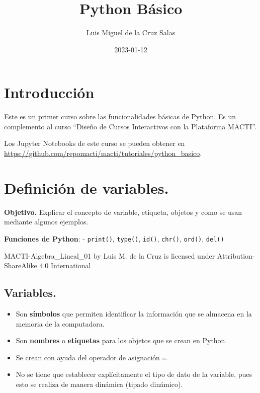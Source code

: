 \documentclass[
  letterpaper,
  DIV=11,
  numbers=noendperiod]{scrreprt}
\title{Python Básico}
\author{Luis Miguel de la Cruz Salas}
\date{2023-01-12}
\providecommand{\tightlist}{%
  \setlength{\itemsep}{0pt}\setlength{\parskip}{0pt}}\usepackage{longtable,booktabs,array}
\renewcommand*\contentsname{Table of contents}
\newcommand\contentsname{Table of contents}
\begin{document}
\maketitle

\renewcommand*\contentsname{Table of contents}
{
\hypersetup{linkcolor=}
\setcounter{tocdepth}{2}
\tableofcontents
}

\chapter*{Introducción}\label{introducciuxf3n}


Este es un primer curso sobre las funcionalidades básicas de Python. Es
un complemento al curso ``Diseño de Cursos Interactivos con la
Plataforma MACTI''.

Los Jupyter Notebooks de este curso se pueden obtener en
\url{https://github.com/repomacti/macti/tutoriales/python_basico}.


\chapter{Definición de variables.}\label{definiciuxf3n-de-variables.}

\textbf{Objetivo.} Explicar el concepto de variable, etiqueta, objetos y
como se usan mediante algunos ejemplos.

\textbf{Funciones de Python}: - \texttt{print()}, \texttt{type()},
\texttt{id()}, \texttt{chr()}, \texttt{ord()}, \texttt{del()}

MACTI-Algebra\_Lineal\_01 by Luis M. de la Cruz is licensed under
Attribution-ShareAlike 4.0 International

\section{Variables.}\label{variables.}

\begin{itemize}
\tightlist
\item
  Son \textbf{símbolos} que permiten identificar la información que se
  almacena en la memoria de la computadora.
\item
  Son \textbf{nombres} o \textbf{etiquetas} para los objetos que se
  crean en Python.
\item
  Se crean con ayuda del operador de asignación \texttt{=}.
\item
  No se tiene que establecer explícitamente el tipo de dato de la
  variable, pues esto se realiza de manera dinámica (tipado dinámico).
\end{itemize}
\end{document}
